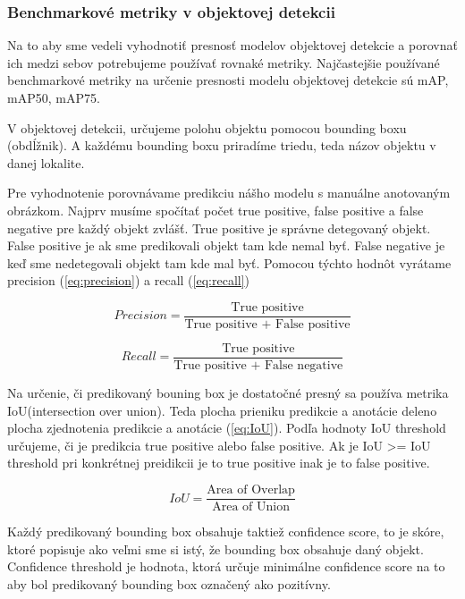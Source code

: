 \subsubsection{Benchmarkové metriky v objektovej detekcii}

Na to aby sme vedeli vyhodnotiť presnosť modelov objektovej detekcie a porovnať ich medzi sebov potrebujeme používať rovnaké metriky. Najčastejšie používané benchmarkové metriky na určenie presnosti modelu objektovej detekcie sú mAP, mAP50, mAP75.

V objektovej detekcii, určujeme polohu objektu pomocou bounding boxu (obdĺžnik). A každému bounding boxu priradíme triedu, teda názov objektu v danej lokalite. 

Pre vyhodnotenie porovnávame predikciu nášho modelu s manuálne anotovaným obrázkom. Najprv musíme spočítať počet true positive, false positive a false negative pre každý objekt zvlášť. True positive je správne detegovaný objekt. False positive je ak sme predikovali objekt tam kde nemal byť. False negative je keď sme nedetegovali objekt tam kde mal byť. Pomocou týchto hodnôt vyrátame precision (\ref{eq:precision}) a recall (\ref{eq:recall})

\begin{equation}
Precision = \frac{\text{True positive}}{\text{True positive + False positive}} \label{eq:precision}
\end{equation}

\begin{equation}
Recall = \frac{\text{True positive}}{\text{True positive + False negative}} \label{eq:recall}
\end{equation}

Na určenie, či predikovaný bouning box je dostatočné presný sa používa metrika IoU(intersection over union). Teda plocha prieniku predikcie a anotácie deleno plocha zjednotenia predikcie a anotácie (\ref{eq:IoU}). Podľa hodnoty IoU threshold určujeme, či je predikcia true positive alebo false positive. Ak je IoU >= IoU threshold pri konkrétnej preidikcii je to true positive inak je to false positive. 

\begin{equation}
IoU = \frac{\text{Area of Overlap}}{\text{Area of Union}} \label{eq:IoU}
\end{equation}

Každý predikovaný bounding box obsahuje taktiež confidence score, to je skóre, ktoré popisuje ako veľmi sme si istý, že bounding box obsahuje daný objekt. Confidence threshold je hodnota, ktorá určuje minimálne confidence score na to aby bol predikovaný bounding box označený ako pozitívny. 

